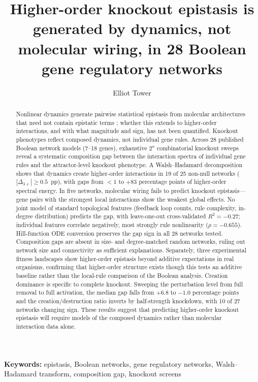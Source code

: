 \documentclass[10pt]{article}
\title{Higher-order knockout epistasis is generated by dynamics, not
molecular wiring, in 28 Boolean gene regulatory networks}
\author{Elliot Tower}
\affil{Independent researcher \\ \texttt{elliot@elliottower.ai}}
\begin{document}
\maketitle
\linenumbers
\doublespacing

\begin{abstract}
Nonlinear dynamics generate pairwise statistical epistasis from
molecular architectures that need not contain epistatic terms
\citep{gjuvsland2007statistical}; whether this extends to
higher-order interactions, and with what magnitude and sign, has not
been quantified. Knockout phenotypes reflect composed dynamics, not
individual gene rules. Across 28 published Boolean network models (7--18 genes), exhaustive
$2^n$ combinatorial knockout sweeps reveal a systematic composition
gap between the interaction spectra of individual gene rules and the
attractor-level knockout phenotype. A Walsh--Hadamard decomposition
shows that dynamics create higher-order interactions
in 19 of 25 non-null networks ($|\Delta_{3+}| \geq 0.5$~pp), with
gaps from $< 1$ to $+83$ percentage points of higher-order spectral
energy. In five networks, molecular wiring fails to predict knockout
epistasis---gene pairs with the strongest local interactions show the
weakest global effects. No joint model of standard
topological features (feedback loop counts, rule complexity,
in-degree distribution) predicts the gap, with leave-one-out
cross-validated $R^2 = -0.27$; individual features correlate
negatively, most strongly rule nonlinearity ($\rho = -0.655$). Hill-function ODE conversion preserves the gap sign in
all 28 networks tested. Composition gaps are absent in size- and
degree-matched random networks, ruling out network size and
connectivity as sufficient explanations. Separately, three experimental
fitness
landscapes show higher-order epistasis beyond additive expectations
in real organisms, confirming that higher-order structure exists
though this tests an additive baseline rather than the local-rule
comparison of the Boolean analysis. Creation dominance is specific to complete
knockout. Sweeping the perturbation level from full removal to full
activation, the median gap falls from $+6.8$ to $-1.0$ percentage points
and the creation/destruction ratio inverts by half-strength knockdown,
with 10 of 27 networks changing sign. These results suggest that predicting higher-order knockout
epistasis will require models of the composed dynamics rather than
molecular interaction data alone.
\end{abstract}

\noindent\textbf{Keywords:}
epistasis, Boolean networks, gene regulatory networks,
Walsh--Hadamard transform, composition gap, knockout screens
\end{document}
